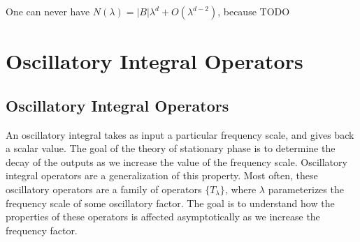 \begin{remark}
    One can never have $N(\lambda) = |B| \lambda^d + O(\lambda^{d-2})$, because TODO
\end{remark}








\chapter{Oscillatory Integral Operators}

\section{Oscillatory Integral Operators}

An oscillatory integral takes as input a particular frequency scale, and gives back a scalar value. The goal of the theory of stationary phase is to determine the decay of the outputs as we increase the value of the frequency scale. Oscillatory integral operators are a generalization of this property. Most often, these oscillatory operators are a family of operators $\{ T_\lambda \}$, where $\lambda$ parameterizes the frequency scale of some oscillatory factor. The goal is to understand how the properties of these operators is affected asymptotically as we increase the frequency factor.

